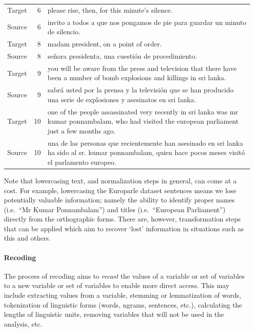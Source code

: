 \documentclass[
]{article}
\begin{document}
\begin{table}
\begin{tabular}[t]{lrl}
Target & 6 & please rise, then, for this minute's silence.\\
Source & 6 & invito a todos a que nos pongamos de pie para guardar un minuto de silencio.\\
\addlinespace
Target & 8 & madam president, on a point of order.\\
Source & 8 & señora presidenta, una cuestión de procedimiento.\\
Target & 9 & you will be aware from the press and television that there have been a number of bomb explosions and killings in sri lanka.\\
Source & 9 & sabrá usted por la prensa y la televisión que se han producido una serie de explosiones y asesinatos en sri lanka.\\
Target & 10 & one of the people assassinated very recently in sri lanka was mr kumar ponnambalam, who had visited the european parliament just a few months ago.\\
\addlinespace
Source & 10 & una de las personas que recientemente han asesinado en sri lanka ha sido al sr. kumar ponnambalam, quien hace pocos meses visitó el parlamento europeo.\\
\bottomrule
\end{tabular}
\end{table}

Note that lowercasing text, and normalization steps in general, can come at a cost. For example, lowercasing the Europarle dataset sentences means we lose potentially valuable information; namely the ability to identify proper names (i.e.~``Mr Kumar Ponnambalam'') and titles (i.e.~``European Parliament'') directly from the orthographic forms. There are, however, transformation steps that can be applied which aim to recover `lost' information in situations such as this and others.

\hypertarget{recoding}{%
\paragraph{Recoding}\label{recoding}}

The process of recoding aims to \emph{recast} the values of a variable or set of variables to a new variable or set of variables to enable more direct access. This may include extracting values from a variable, stemming or lemmatization of words, tokenization of linguistic forms (words, ngrams, sentences, etc.), calculating the lengths of linguistic units, removing variables that will not be used in the analysis, etc.
\end{document}
